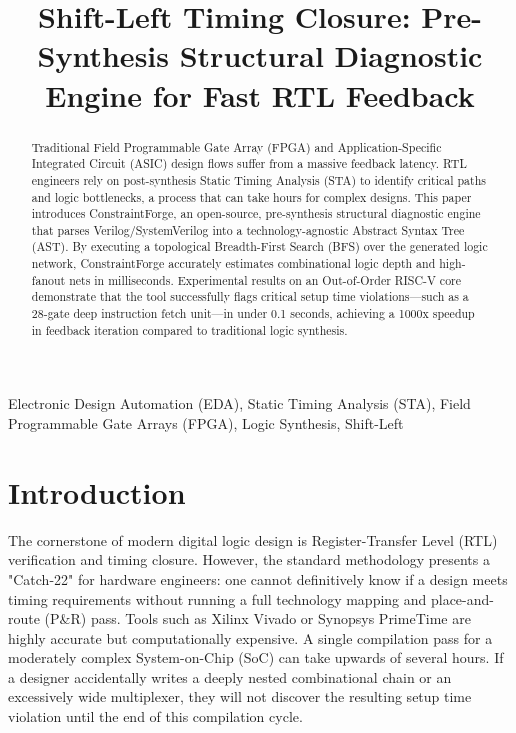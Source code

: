 \documentclass[conference]{IEEEtran}
\begin{document}
\title{Shift-Left Timing Closure: Pre-Synthesis Structural Diagnostic Engine for Fast RTL Feedback}

\author{
}

\maketitle

\begin{abstract}
Traditional Field Programmable Gate Array (FPGA) and Application-Specific Integrated Circuit (ASIC) design flows suffer from a massive feedback latency. RTL engineers rely on post-synthesis Static Timing Analysis (STA) to identify critical paths and logic bottlenecks, a process that can take hours for complex designs. This paper introduces ConstraintForge, an open-source, pre-synthesis structural diagnostic engine that parses Verilog/SystemVerilog into a technology-agnostic Abstract Syntax Tree (AST). By executing a topological Breadth-First Search (BFS) over the generated logic network, ConstraintForge accurately estimates combinational logic depth and high-fanout nets in milliseconds. Experimental results on an Out-of-Order RISC-V core demonstrate that the tool successfully flags critical setup time violations—such as a 28-gate deep instruction fetch unit—in under 0.1 seconds, achieving a 1000x speedup in feedback iteration compared to traditional logic synthesis. 
\end{abstract}

\begin{IEEEkeywords}
Electronic Design Automation (EDA), Static Timing Analysis (STA), Field Programmable Gate Arrays (FPGA), Logic Synthesis, Shift-Left
\end{IEEEkeywords}

\section{Introduction}
The cornerstone of modern digital logic design is Register-Transfer Level (RTL) verification and timing closure. However, the standard methodology presents a "Catch-22" for hardware engineers: one cannot definitively know if a design meets timing requirements without running a full technology mapping and place-and-route (P\&R) pass. Tools such as Xilinx Vivado or Synopsys PrimeTime are highly accurate but computationally expensive. A single compilation pass for a moderately complex System-on-Chip (SoC) can take upwards of several hours. If a designer accidentally writes a deeply nested combinational chain or an excessively wide multiplexer, they will not discover the resulting setup time violation until the end of this compilation cycle.
\end{document}
